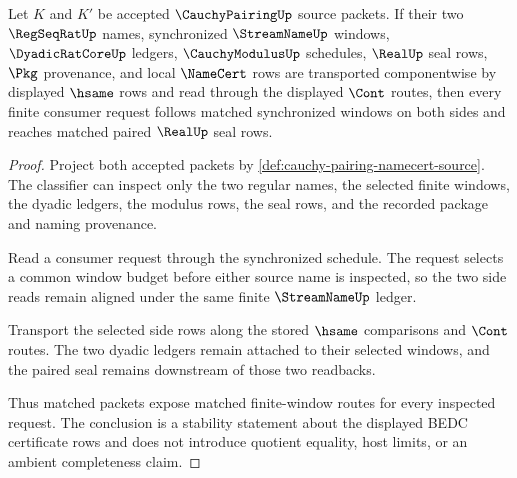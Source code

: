 \begin{theorem}
\label{thm:cauchy-pairing-synchronized-window-stability}
Let $K$ and $K'$ be accepted $\CauchyPairingUp$ source packets. If their two $\RegSeqRatUp$ names, synchronized $\StreamNameUp$ windows, $\DyadicRatCoreUp$ ledgers, $\CauchyModulusUp$ schedules, $\RealUp$ seal rows, $\Pkg$ provenance, and local $\NameCert$ rows are transported componentwise by displayed $\hsame$ rows and read through the displayed $\Cont$ routes, then every finite consumer request follows matched synchronized windows on both sides and reaches matched paired $\RealUp$ seal rows.
\end{theorem}
\begin{proof}
Project both accepted packets by \autoref{def:cauchy-pairing-namecert-source}. The classifier can inspect only the two regular names, the selected finite windows, the dyadic ledgers, the modulus rows, the seal rows, and the recorded package and naming provenance.

Read a consumer request through the synchronized schedule. The request selects a common window budget before either source name is inspected, so the two side reads remain aligned under the same finite $\StreamNameUp$ ledger.

Transport the selected side rows along the stored $\hsame$ comparisons and $\Cont$ routes. The two dyadic ledgers remain attached to their selected windows, and the paired seal remains downstream of those two readbacks.

Thus matched packets expose matched finite-window routes for every inspected request. The conclusion is a stability statement about the displayed BEDC certificate rows and does not introduce quotient equality, host limits, or an ambient completeness claim.
\end{proof}

